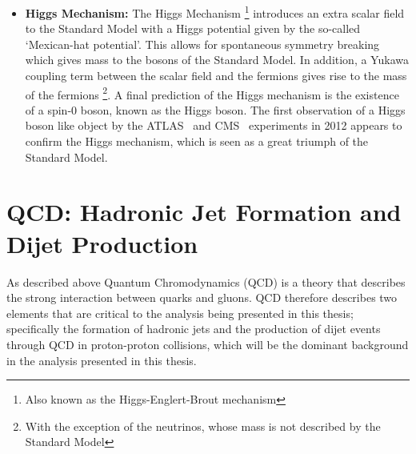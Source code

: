 \begin{itemize}[leftmargin=*]
  Quantum Chromodynamics (QCD) is a theory based on a $SU(3)$ gauge symmetry that describes the strong force.
  The strong force is mediated by the gluon and interacts with particles that have colour charge; which are quarks and gluons.
  The fact that the gluon has colour charge means that the gluon is self interacting.
  The $SU(3)$ symmetry results in 3 colour charges: known as red, green and blue.
  An anti-quark has colour charge anti-red, anti-blue or anti-green.
  A colour neutral object can be formed if all three colour charges are present (i.e. in a baryon containing three quarks)
  or if a colour and the corresponding anti-colour is present (i.e. in a meson that contains $q\bar{q}$).
  QCD is important in terms of understanding hadronic jet formation and the production of the
  largest background in a di-$b$-jet search, so further details can be found in section in Section~\ref{sec:theo-qcd}.\\

\item\textbf{Higgs Mechanism:}
  The Higgs Mechanism \footnote{Also known as the Higgs-Englert-Brout mechanism}
  introduces an extra scalar field to the Standard Model
  with a Higgs potential given by the so-called `Mexican-hat potential'.
  This allows for spontaneous symmetry breaking which gives mass to the bosons of the Standard Model.
  In addition, a Yukawa coupling term between the scalar field and the fermions gives rise to the mass of the fermions
  \footnote{With the exception of the neutrinos, whose mass is not described by the Standard Model}.
  A final prediction of the Higgs mechanism is the existence of a spin-0 boson, known as the Higgs boson.
  The first observation of a Higgs boson like object by the ATLAS~\cite{theo-higgs_atlas} and CMS~\cite{theo-higgs_cms} experiments
  in 2012 appears to confirm the Higgs mechanism, which is seen as a great triumph of the Standard Model.
\end{itemize}

\section{QCD: Hadronic Jet Formation and Dijet Production}
\label{sec:theo-qcd}

As described above Quantum Chromodynamics (QCD) is a theory that describes the strong interaction between
quarks and gluons.
QCD therefore describes two elements that are critical to the analysis being presented in this thesis;
specifically the formation of hadronic jets and the production of dijet events through QCD in proton-proton collisions,
which will be the dominant background in the analysis presented in this thesis.

